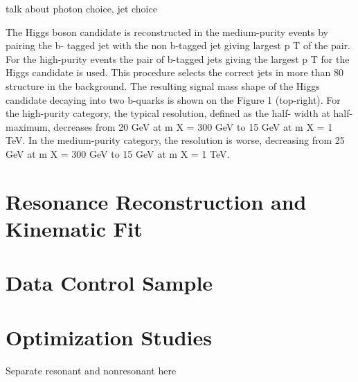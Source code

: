 talk about photon choice, jet choice

The  Higgs  boson  candidate  is  reconstructed  in  the  medium-purity  events  by  pairing  the  b-
tagged jet with the non b-tagged jet giving largest
p
T
of the pair.  For the high-purity events
the pair of b-tagged jets giving the largest
p
T
for the Higgs candidate is used.  This procedure
selects the correct jets in more than 80%
structure in the background.
The resulting signal mass shape of the Higgs candidate decaying into two b-quarks is shown on
the Figure 1 (top-right). For the high-purity category, the typical resolution, defined as the half-
width at half-maximum, decreases from 20 GeV at
m
X
=
300 GeV to 15 GeV at
m
X
=
1 TeV. In
the medium-purity category, the resolution is worse, decreasing from 25 GeV at
m
X
=
300 GeV
to 15 GeV at
m
X
=
1 TeV.



\section{Resonance Reconstruction and Kinematic Fit\label{sec:Xreconstruction}}

\section{Data Control Sample\label{sec:dataCS}}

\section{Optimization Studies\label{sec:optim}}
Separate resonant and nonresonant here


